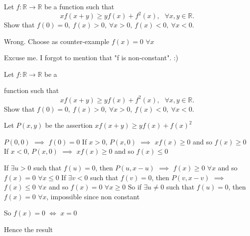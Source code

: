 \begin{solution}
	\begin{tcolorbox}Let $ f : \mathbb{R} \to \mathbb{R}$ be a function such that \[\displaystyle{ xf(x+y)\geq yf(x)+f^2(x)   , \ \ \ \forall x,y \in  \mathbb{R}.  }\]
Show that $f(0)=0, \ f(x)>0, \ \forall x>0, \ f(x)<0, \ \forall x<0.$\end{tcolorbox}
Wrong.
Choose as counter-example $f(x)=0$ $\forall x$
\end{solution}



\begin{solution}
	Excuse me. I forgot to mention that "f is non-constant". :)
\end{solution}



\begin{solution}
	\begin{tcolorbox}Let $ f : \mathbb{R} \to \mathbb{R}$ be a function such that \[\displaystyle{ xf(x+y)\geq yf(x)+f^2(x)   , \ \ \ \forall x,y \in  \mathbb{R}.  }\]
Show that $f(0)=0, \ f(x)>0, \ \forall x>0, \ f(x)<0, \ \forall x<0.$\end{tcolorbox}
Let $P(x,y)$ be the assertion $xf(x+y)\ge yf(x)+f(x)^2$

$P(0,0)$ $\implies$ $f(0)=0$
If $x>0$, $P(x,0)$ $\implies$ $xf(x)\ge 0$ and so $f(x)\ge 0$
If $x<0$, $P(x,0)$ $\implies$ $xf(x)\ge 0$ and so $f(x)\le 0$

If $\exists u>0$ such that $f(u)=0$, then $P(u,x-u)$ $\implies$ $f(x)\ge 0$ $\forall x$ and so $f(x)=0$ $\forall x\le 0$
If $\exists v<0$ such that $f(v)=0$, then $P(v,x-v)$ $\implies$ $f(x)\le 0$ $\forall x$ and so $f(x)=0$ $\forall x\ge 0$
So if $\exists u\ne 0$ such that $f(u)=0$, then $f(x)=0$ $\forall x$, impossible since non constant

So $f(x)=0$ $\iff$ $x=0$

Hence the result
\end{solution}



